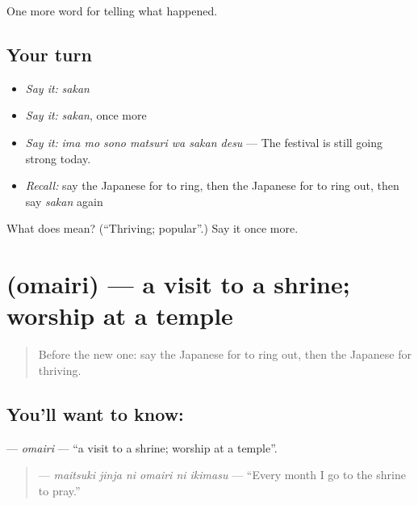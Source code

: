 \begin{grammarlens}[title={What you've built}]
One more word for telling what happened.
\end{grammarlens}

\subsection*{Your turn}
\begin{itemize}
\raggedright
  \item \emph{Say it:} \emph{sakan}
  \item \emph{Say it:} \emph{sakan}, once more
  \item \emph{Say it:} \emph{ima mo sono matsuri wa sakan desu} — The festival is still going strong today.
  \item \emph{Recall:} say the Japanese for to ring, then the Japanese for to ring out, then say \emph{sakan} again
\end{itemize}

\begin{tcolorbox}[breakable,colback=teal!4,colframe=teal!35!black,title={Before you move on}]
What does  mean? (\textquotedblleft{}Thriving; popular\textquotedblright{}.) Say it once more.
\end{tcolorbox}
\section[\texorpdfstring{\ja{おまいり} (omairi)}{おまいり (omairi)}]{ (omairi) — a visit to a shrine; worship at a temple}

\label{lesson:JA-C296-omairi}



\begin{quote}
Before the new one: say the Japanese for to ring out, then the Japanese for thriving.
\end{quote}

\subsection*{You'll want to know: }
\textbf{} — \emph{omairi} — \textquotedblleft{}a visit to a shrine; worship at a temple\textquotedblright{}.

\begin{quote}
\textbf{   } — \emph{maitsuki jinja ni omairi ni ikimasu} — \textquotedblleft{}Every month I go to the shrine to pray.\textquotedblright{}
\end{quote}


